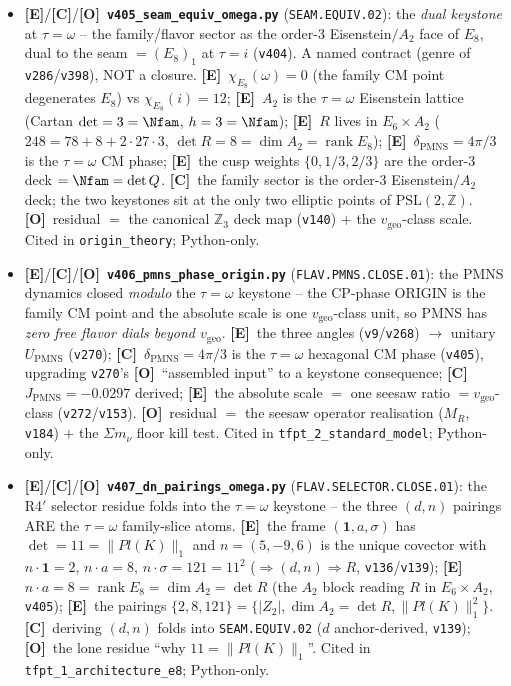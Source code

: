 \documentclass[11pt]{article}
\providecommand{\mE}{\textbf{[E]}}\providecommand{\mC}{\textbf{[C]}}
\providecommand{\mO}{\textbf{[O]}}\providecommand{\mX}{\textbf{[X]}}
\providecommand{\vref}[1]{\texttt{#1}}
\begin{document}
\begin{itemize}
\item \mE/\mC/\mO\ \textbf{\texttt{v405\_seam\_equiv\_omega.py}} (\texttt{SEAM.EQUIV.02}): the \emph{dual keystone} at $\tau{=}\omega$ -- the family/flavor sector as the order-$3$ Eisenstein$/A_2$ face of $E_8$, dual to the seam $=(E_8)_1$ at $\tau{=}i$ (\vref{v404}). A named contract (genre of \vref{v286}/\vref{v398}), NOT a closure. \mE\ $\chi_{E_8}(\omega)=0$ (the family CM point degenerates $E_8$) vs $\chi_{E_8}(i)=12$; \mE\ $A_2$ is the $\tau{=}\omega$ Eisenstein lattice (Cartan $\det=3=\Nfam$, $h=3=\Nfam$); \mE\ $R$ lives in $E_6{\times}A_2$ ($248=78+8+2{\cdot}27{\cdot}3$, $\det R=8=\dim A_2=\operatorname{rank}E_8$); \mE\ $\delta_{\mathrm{PMNS}}=4\pi/3$ is the $\tau{=}\omega$ CM phase; \mE\ the cusp weights $\{0,1/3,2/3\}$ are the order-$3$ deck $=\Nfam=\det Q$. \mC\ the family sector is the order-$3$ Eisenstein$/A_2$ deck; the two keystones sit at the only two elliptic points of $\mathrm{PSL}(2,\mathbb Z)$. \mO\ residual $=$ the canonical $\mathbb Z_3$ deck map (\vref{v140}) $+$ the $v_{\mathrm{geo}}$-class scale. Cited in \texttt{origin\_theory}; Python-only.
\item \mE/\mC/\mO\ \textbf{\texttt{v406\_pmns\_phase\_origin.py}} (\texttt{FLAV.PMNS.CLOSE.01}): the PMNS dynamics closed \emph{modulo} the $\tau{=}\omega$ keystone -- the CP-phase ORIGIN is the family CM point and the absolute scale is one $v_{\mathrm{geo}}$-class unit, so PMNS has \emph{zero free flavor dials beyond $v_{\mathrm{geo}}$}. \mE\ the three angles (\vref{v9}/\vref{v268}) $\to$ unitary $U_{\mathrm{PMNS}}$ (\vref{v270}); \mC\ $\delta_{\mathrm{PMNS}}=4\pi/3$ is the $\tau{=}\omega$ hexagonal CM phase (\vref{v405}), upgrading \vref{v270}'s \mO\ ``assembled input'' to a keystone consequence; \mC\ $J_{\mathrm{PMNS}}=-0.0297$ derived; \mE\ the absolute scale $=$ one seesaw ratio $=v_{\mathrm{geo}}$-class (\vref{v272}/\vref{v153}). \mO\ residual $=$ the seesaw operator realisation ($M_R$, \vref{v184}) $+$ the $\Sigma m_\nu$ floor kill test. Cited in \texttt{tfpt\_2\_standard\_model}; Python-only.
\item \mE/\mC/\mO\ \textbf{\texttt{v407\_dn\_pairings\_omega.py}} (\texttt{FLAV.SELECTOR.CLOSE.01}): the R4$'$ selector residue folds into the $\tau{=}\omega$ keystone -- the three $(d,n)$ pairings ARE the $\tau{=}\omega$ family-slice atoms. \mE\ the frame $(\mathbf 1,a,\sigma)$ has $\det=11=\|Pl(K)\|_1$ and $n=(5,-9,6)$ is the unique covector with $n{\cdot}\mathbf1=2$, $n{\cdot}a=8$, $n{\cdot}\sigma=121=11^2$ ($\Rightarrow(d,n)\Rightarrow R$, \vref{v136}/\vref{v139}); \mE\ $n{\cdot}a=8=\operatorname{rank}E_8=\dim A_2=\det R$ (the $A_2$ block reading $R$ in $E_6{\times}A_2$, \vref{v405}); \mE\ the pairings $\{2,8,121\}=\{|Z_2|,\dim A_2{=}\det R,\|Pl(K)\|_1^2\}$. \mC\ deriving $(d,n)$ folds into \texttt{SEAM.EQUIV.02} ($d$ anchor-derived, \vref{v139}); \mO\ the lone residue ``why $11{=}\|Pl(K)\|_1$''. Cited in \texttt{tfpt\_1\_architecture\_e8}; Python-only.
\end{itemize}
\end{document}

